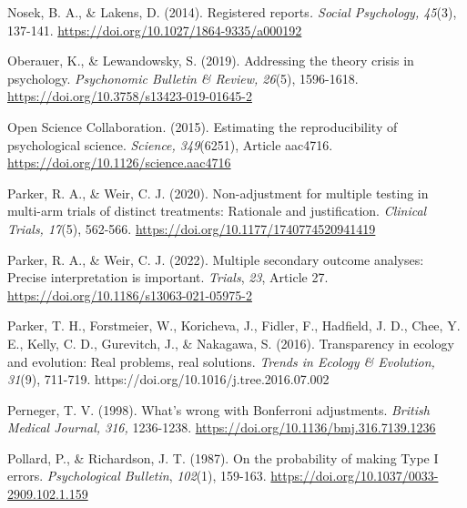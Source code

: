 \documentclass[authordate, empirical]{jote-new-article}
\begin{document}
	Nosek, B. A., \& Lakens, D. (2014). Registered reports\emph{. Social Psychology, 45}(3), 137-141. \href{https://doi.org/10.1027/1864-9335/a000192}{https://doi.org/10.1027/1864-9335/a000192}



	Oberauer, K., \& Lewandowsky, S. (2019). Addressing the theory crisis in psychology. \emph{Psychonomic Bulletin \& Review, 26}(5), 1596-1618. \href{https://doi.org/10.3758/s13423-019-01645-2}{https://doi.org/10.3758/s13423-019-01645-2}



	Open Science Collaboration. (2015). Estimating the reproducibility of psychological science. \emph{Science, 349}(6251), Article aac4716. \href{https://doi.org/10.1126/science.aac4716}{https://doi.org/10.1126/science.aac4716}



	Parker, R. A., \& Weir, C. J. (2020). Non-adjustment for multiple testing in multi-arm trials of distinct treatments: Rationale and justification. \emph{Clinical Trials, 17}(5), 562-566. \href{https://doi.org/10.1177/1740774520941419}{https://doi.org/10.1177/1740774520941419}



	Parker, R. A., \& Weir, C. J. (2022). Multiple secondary outcome analyses: Precise interpretation is important. \emph{Trials}, \emph{23}, Article 27. \href{https://doi.org/10.1186/s13063-021-05975-2}{https://doi.org/10.1186/s13063-021-05975-2}



	Parker, T. H., Forstmeier, W., Koricheva, J., Fidler, F., Hadfield, J. D., Chee, Y. E., Kelly, C. D., Gurevitch, J., \& Nakagawa, S. (2016). Transparency in ecology and evolution: Real problems, real solutions. \emph{Trends in Ecology \& Evolution, 31}(9), 711-719. https://doi.org/10.1016/j.tree.2016.07.002



	Perneger, T. V. (1998). What's wrong with Bonferroni adjustments. \emph{British Medical Journal, 316,} 1236-1238. \href{https://doi.org/10.1136/bmj.316.7139.1236}{https://doi.org/10.1136/bmj.316.7139.1236}



	Pollard, P., \& Richardson, J. T. (1987). On the probability of making Type I errors. \emph{Psychological Bulletin}, \emph{102}(1), 159-163. \href{https://psycnet.apa.org/doi/10.1037/0033-2909.102.1.159}{https://doi.org/10.1037/0033-2909.102.1.159}
\end{document}
